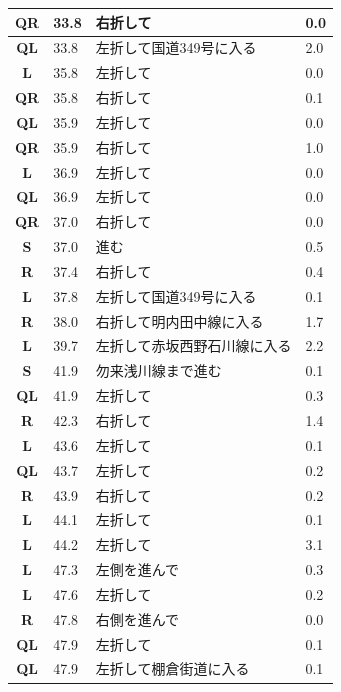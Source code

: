\documentclass[11pt]{article}
\begin{document}
\begin{center}
\begin{supertabular}{|c|p{0.30in}|p{2.25in}|l|}
 \textbf{QR} &  33.8 & 右折して &   0.0 \\ \hline
 \textbf{QL} &  33.8 & 左折して国道349号に入る &   2.0 \\ \hline
 \textbf{L} &  35.8 & 左折して &   0.0 \\ \hline
{} \textbf{QR} &  35.8 & 右折して &   0.1 \\ \hline
 \textbf{QL} &  35.9 & 左折して &   0.0 \\ \hline
{} \textbf{QR} &  35.9 & 右折して &   1.0 \\ \hline
 \textbf{L} &  36.9 & 左折して &   0.0 \\ \hline
 \textbf{QL} &  36.9 & 左折して &   0.0 \\ \hline
{} \textbf{QR} &  37.0 & 右折して &   0.0 \\ \hline
 \textbf{S} &  37.0 & 進む &   0.5 \\ \hline
{} \textbf{R} &  37.4 & 右折して &   0.4 \\ \hline
 \textbf{L} &  37.8 & 左折して国道349号に入る &   0.1 \\ \hline
{} \textbf{R} &  38.0 & 右折して明内田中線に入る &   1.7 \\ \hline
 \textbf{L} &  39.7 & 左折して赤坂西野石川線に入る &   2.2 \\ \hline
 \textbf{S} &  41.9 & 勿来浅川線まで進む &   0.1 \\ \hline
 \textbf{QL} &  41.9 & 左折して &   0.3 \\ \hline
{} \textbf{R} &  42.3 & 右折して &   1.4 \\ \hline
 \textbf{L} &  43.6 & 左折して &   0.1 \\ \hline
 \textbf{QL} &  43.7 & 左折して &   0.2 \\ \hline
{} \textbf{R} &  43.9 & 右折して &   0.2 \\ \hline
 \textbf{L} &  44.1 & 左折して &   0.1 \\ \hline
 \textbf{L} &  44.2 & 左折して &   3.1 \\ \hline
 \textbf{L} &  47.3 & 左側を進んで &   0.3 \\ \hline
 \textbf{L} &  47.6 & 左折して &   0.2 \\ \hline
{} \textbf{R} &  47.8 & 右側を進んで &   0.0 \\ \hline
 \textbf{QL} &  47.9 & 左折して &   0.1 \\ \hline
 \textbf{QL} &  47.9 & 左折して棚倉街道に入る &   0.1 \\ \hline

\end{supertabular}
\end{center}
\end{document}
